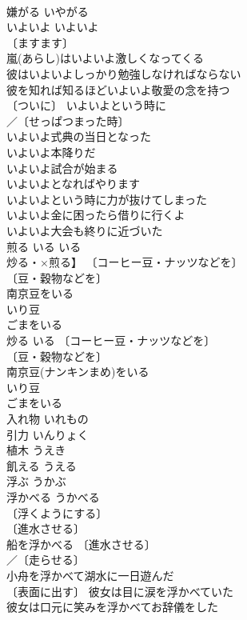 \documentclass[8pt]{extreport}
\begin{document}
\begin{CJK}{UTF8}{min}
\\	嫌がる	いやがる	
\\	いよいよ	いよいよ	
\\	〔ますます〕
\\	嵐(あらし)はいよいよ激しくなってくる 
\\	彼はいよいよしっかり勉強しなければならない 
\\	彼を知れば知るほどいよいよ敬愛の念を持つ 
\\	〔ついに〕 いよいよという時に 
\\	／〔せっぱつまった時〕
\\	いよいよ式典の当日となった 
\\	いよいよ本降りだ 
\\	いよいよ試合が始まる 
\\	いよいよとなればやります 
\\	いよいよという時に力が抜けてしまった 
\\	いよいよ金に困ったら借りに行くよ 
\\	いよいよ大会も終りに近づいた 
\\	煎る	いる	いる
\\	炒る・×煎る】 〔コーヒー豆・ナッツなどを〕
\\	〔豆・穀物などを〕
\\	南京豆をいる 
\\	いり豆 
\\	ごまをいる 
\\	炒る	いる	〔コーヒー豆・ナッツなどを〕
\\	〔豆・穀物などを〕
\\	南京豆(ナンキンまめ)をいる 
\\	いり豆 
\\	ごまをいる 
\\	入れ物	いれもの	
\\	引力	いんりょく	
\\	植木	うえき	
\\	飢える	うえる	
\\	浮ぶ	うかぶ	
\\	浮かべる	うかべる	
\\	〔浮くようにする〕
\\	〔進水させる〕
\\	船を浮かべる 〔進水させる〕
\\	／〔走らせる〕
\\	小舟を浮かべて湖水に一日遊んだ 
\\	〔表面に出す〕 彼女は目に涙を浮かべていた 
\\	彼女は口元に笑みを浮かべてお辞儀をした 

\end{CJK}
\end{document}
